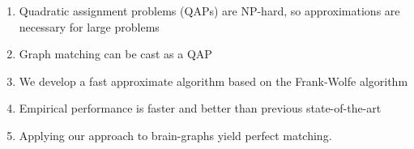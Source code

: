 \documentclass[preprint,11pt]{elsarticle}
\begin{document}
\begin{enumerate}
	\item Quadratic assignment problems (QAPs) are NP-hard, so approximations are necessary for large problems
	\item Graph matching can be cast as a QAP
	\item We develop a fast approximate algorithm based on the Frank-Wolfe algorithm
	\item Empirical performance is faster and better than previous state-of-the-art
	\item Applying our approach to brain-graphs yield perfect matching.
\end{enumerate}

\newpage

 
\end{document}
